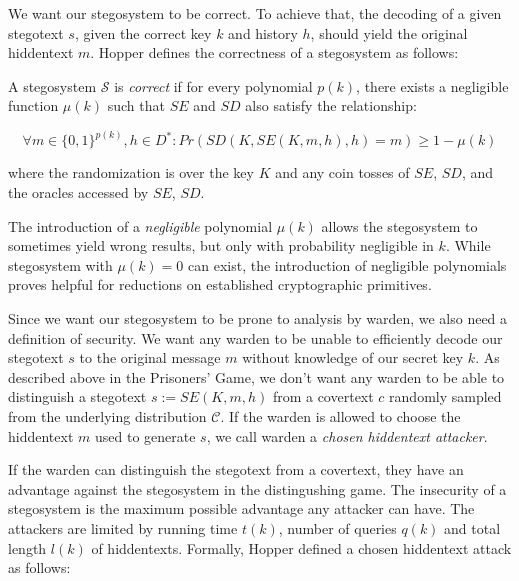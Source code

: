 We want our stegosystem to be correct.
To achieve that, the decoding of a given stegotext $s$, given the correct key $k$ and history $h$, should yield the original hiddentext $m$.
Hopper defines the correctness of a stegosystem as follows:

\begin{definition}
\label{def:correctness-hopper}
A stegosystem $\mathcal{S}$ is \emph{correct} if for every polynomial $p(k)$, there exists a negligible function $\mu(k)$ such that $SE$ and $SD$ also satisfy the relationship:

$$\forall m \in \{0,1\}^{p(k)}, h \in D^* \colon Pr(SD(K, SE(K, m, h), h) = m) \geq 1 - \mu(k)$$

where the randomization is over the key $K$ and any coin tosses of $SE$, $SD$, and the oracles accessed by $SE$, $SD$.
\end{definition}

The introduction of a \emph{negligible} polynomial $\mu(k)$ allows the stegosystem to sometimes yield wrong results, but only with probability negligible in $k$.
While stegosystem with $\mu(k) = 0$ can exist, the introduction of negligible polynomials proves helpful for reductions on established cryptographic primitives. 

Since we want our stegosystem to be prone to analysis by warden, we also need a definition of security.
We want any warden to be unable to efficiently decode our stegotext $s$ to the original message $m$ without knowledge of our secret key $k$.
As described above in the Prisoners' Game, we don't want any warden to be able to distinguish a stegotext $s := SE(K, m, h)$ from a covertext $c$ randomly sampled from the underlying distribution $\mathcal{C}$.
If the warden is allowed to choose the hiddentext $m$ used to generate $s$, we call warden a \emph{chosen hiddentext attacker}. 

If the warden can distinguish the stegotext from a covertext, they have an advantage against the stegosystem in the distingushing game.
The insecurity of a stegosystem is the maximum possible advantage any attacker can have.
The attackers are limited by running time $t(k)$, number of queries $q(k)$ and total length $l(k)$ of hiddentexts.
Formally, Hopper defined a chosen hiddentext attack as follows:

